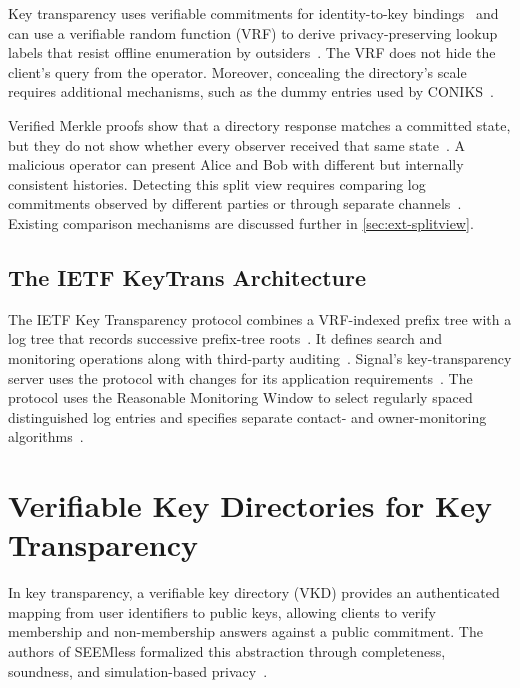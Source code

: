 Key transparency uses verifiable commitments for identity-to-key
bindings~\cite[Sections~1 and 3]{melara2015coniks} and can use a verifiable
random function (VRF) to derive privacy-preserving lookup labels that resist
offline enumeration by outsiders~\cite[Section~1]{rfc9381}. The VRF does not
hide the client's query from the operator. Moreover, concealing the directory's scale
requires additional mechanisms, such as the dummy entries used by
CONIKS~\cite[Section~2.2]{melara2015coniks}.

Verified Merkle proofs show that a directory response matches a committed state, but they do not
show whether every observer received that same state~\cite[Section~3.3]{ietf-keytrans-architecture}.
A malicious operator can present Alice and Bob with different but internally consistent histories.
Detecting this split view requires comparing log commitments observed by different parties or through
separate channels~\cites[Section~4.1.4]{melara2015coniks}[Section~10.2]{ietf-keytrans-protocol}.
Existing comparison mechanisms are discussed further in \cref{sec:ext-splitview}.

\subsection{The IETF KeyTrans Architecture}\label{ssec:bg-keytrans}

The IETF Key Transparency protocol combines a VRF-indexed prefix tree with a log tree that records
successive prefix-tree roots~\cite[Sections~3.3--3.4 and~11.7--11.8]{ietf-keytrans-protocol}. It defines search and monitoring operations
along with third-party auditing~\cite[Sections~13.1--13.4 and~15.2]{ietf-keytrans-protocol}. Signal's key-transparency server uses the protocol
with changes for its application requirements~\cite{signal-kt-server}. The protocol uses the
Reasonable Monitoring Window to select regularly spaced distinguished log entries and specifies
separate contact- and owner-monitoring algorithms~\cite[Sections~6.1 and
8.2--8.3]{ietf-keytrans-protocol}.

\section{Verifiable Key Directories for Key Transparency}\label{sec:bg-vkd}

In key transparency, a verifiable key directory (VKD) provides an authenticated mapping from user
identifiers to public keys, allowing clients to verify membership and non-membership answers against
a public commitment. The authors of SEEMless formalized this abstraction through completeness,
soundness, and simulation-based privacy~\cite[Section~2]{chase2019seemless}.

